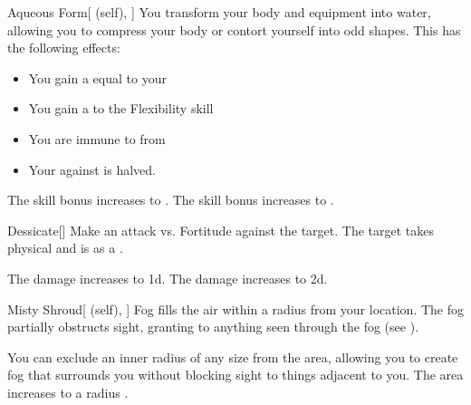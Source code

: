 \lowercase{\hypertarget{spell:Aqueous Form}{}}\label{spell:Aqueous Form}
\begin{attuneability}[Rank 4]{\hypertarget{spell:Aqueous Form}{Aqueous Form}}[ (self), ]
You transform your body and equipment into water, allowing you to compress your body or contort yourself into odd shapes.
This has the following effects:
\begin{itemize}
\item You gain a  equal to your 
\item You gain a   to the Flexibility skill
\item You are immune to  from 
\item Your  against  is halved.
\end{itemize}

\rankline
{} The skill bonus increases to .
 The skill bonus increases to .

\end{attuneability}
\vspace{0.25em}



\lowercase{\hypertarget{spell:Dessicate}{}}\label{spell:Dessicate}
\begin{freeability}[Rank 4]{\hypertarget{spell:Dessicate}{Dessicate}}[]
Make an attack vs. Fortitude against the target.
\hit The target takes physical  and is  as a .

\rankline
{} The damage increases to  \plus1d.
 The damage increases to  \plus2d.

\end{freeability}
\vspace{0.25em}



\lowercase{\hypertarget{spell:Misty Shroud}{}}\label{spell:Misty Shroud}
\begin{attuneability}[Rank 4]{\hypertarget{spell:Misty Shroud}{Misty Shroud}}[ (self), ]
\targetrule
Fog fills the air within a \areamed radius  from your location.
The fog partially obstructs sight, granting  to anything seen through the fog (see ).

\rankline
{} You can exclude an inner radius of any size from the area, allowing you to create fog that surrounds you without blocking sight to things adjacent to you.
 The area increases to a \arealarge radius .

\end{attuneability}
\vspace{0.25em}



